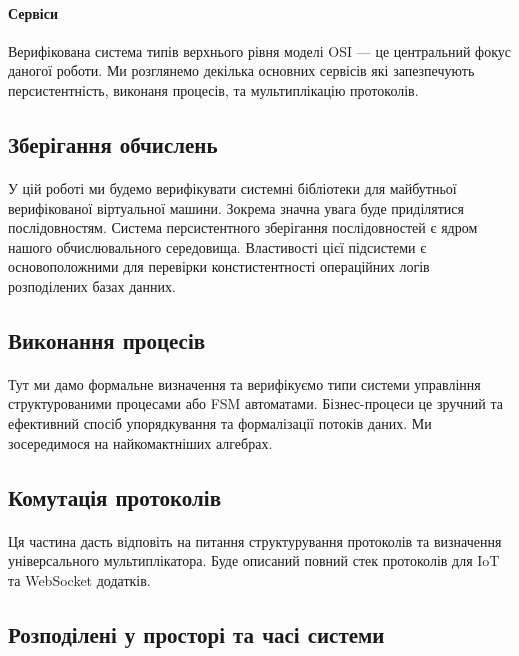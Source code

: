 \documentclass[11pt,oneside]{article}
\begin{document}
   \paragraph{\bf Сервіси}
   Верифікована система типів верхнього рівня моделі OSI --- це центральний фокус даногої роботи.
   Ми розглянемо декілька основних сервісів які запезпечують персистентність, виконаня процесів,
   та мультиплікацію протоколів.

   \newpage

\subsection*{Зберігання обчислень}
   \paragraph{}
   У цій роботі ми будемо верифікувати системні бібліотеки для
   майбутньої верифікованої віртуальної машини. Зокрема значна увага буде приділятися
   послідовностям. Система персистентного зберігання послідовностей є ядром нашого
   обчислювального середовища. Властивості цієї підсистеми є основоположними
   для перевірки констистентності операційних логів розподілених базах данних.


\subsection*{Виконання процесів}
   \paragraph{}
   Тут ми дамо формальне визначення та верифікуємо
   типи системи управління структурованими процесами або FSM автоматами.
   Бізнес-процеси це зручний та ефективний спосіб упорядкування та формалізації
   потоків даних. Ми зосередимося на найкомактніших алгебрах.

\subsection*{Комутація протоколів}
   \paragraph{}
   Ця частина дасть відповіть на питання структурування
   протоколів та визначення універсального мультиплікатора. Буде описаний повний стек
   протоколів для IoT та WebSocket додатків.

\subsection*{Розподілені у просторі та часі системи}
\end{document}
